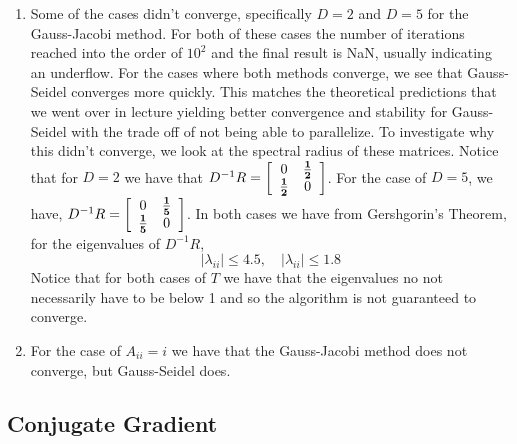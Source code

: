 \documentclass{article}
\begin{document}
\begin{enumerate}
\begin{center}
    \end{center}


    \item 
        
    Some of the cases didn't converge, specifically $D = 2$ and $D = 5$ for the Gauss-Jacobi method. For both of these cases the number of iterations reached into the order of $10^2$ and the final result is NaN, usually indicating an underflow. For the cases where both methods converge, we see that Gauss-Seidel converges more quickly. This matches the theoretical predictions that we went over in lecture yielding better convergence and stability for Gauss-Seidel with the trade off of not being able to parallelize. To investigate why this didn't converge, we look at the spectral radius of these matrices. Notice that for $D = 2$ we have that $D^{-1}R = \left[\begin{array}{c c} 0 & \boldsymbol{\frac{1}{2}} \\ \boldsymbol{\frac{1}{2}} & 0 \end{array}\right]$. For the case of $D=5$, we have, $D^{-1}R = \left[\begin{array}{c c} 0 & \boldsymbol{\frac{1}{5}} \\ \boldsymbol{\frac{1}{5}} & 0 \end{array}\right]$. In both cases we have from Gershgorin's Theorem, for the eigenvalues of $D^{-1}R$,
    \[
        |\lambda_{ii}| \le  4.5,\quad |\lambda_{ii}| \le 1.8
    \]
    Notice that for both cases of $T$ we have that the eigenvalues no not necessarily have to be below 1 and so the algorithm is not guaranteed to converge. 

    \item 
    For the case of $A_{ii} = i$ we have that the Gauss-Jacobi method does not converge, but Gauss-Seidel does. 

    \end{enumerate}

\subsection{Conjugate Gradient}
\end{document}
